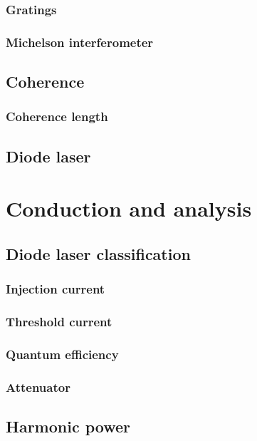 \documentclass[11pt, english, fleqn, DIV=15, headinclude, BCOR=2cm]{scrreprt}
\begin{document}
\subsection{Gratings}

\subsection{Michelson interferometer}

\section{Coherence}

\subsection{Coherence length}

\section{Diode laser}

\chapter{Conduction and analysis}

\section{Diode laser classification}

\subsection{Injection current}

\subsection{Threshold current}

\subsection{Quantum efficiency}

\subsection{Attenuator}

\section{Harmonic power}
\end{document}
